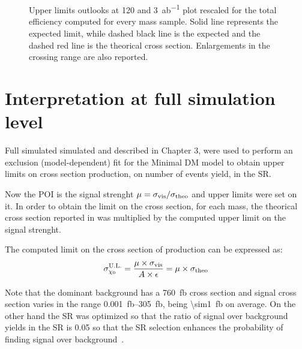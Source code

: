 \begin{figure}[tp]
\centering
{} \quad
{} \\
 \quad
{} \\
\caption{Upper limits outlooks at \SI{120}{\ifb} and \SI{3}{ab^{-1}} plot rescaled for the total efficiency computed for every mass sample. Solid line represents the expected limit, while dashed black line is the expected and the dashed red line is the theorical cross section. Enlargements in the crossing range are also reported.}
\label{fig:outlookmi}
\end{figure}


\section{Interpretation at full simulation level}
\label{sec:full}
Full simulated simulated and described in Chapter 3, were used to perform an exclusion (model-dependent) fit for the Minimal DM model to obtain upper limits on \chizero cross section production, on number of events yield, in the SR.

Now the POI is the signal strenght $\mu=\sigma_\textup{{vis}}/\sigma_{\textup{theo}}$ and upper limits were set on it. In order to obtain the limit on the cross section, for each mass, the theorical cross section reported in \Tab{\ref{tab:eff}} was multiplied by the computed upper limit on the signal strenght. 

The computed limit on the cross section of \chizero production can be expressed as:
\begin{equation}
	\sigma_{\chi_0}^\textup{U.L.}=\frac{\mu\times\sigma_\textup{vis}}{A\times\epsilon}=\mu\times\sigma_\textup{theo}
\end{equation}

Note that the dominant background \znng has a \SI{760}{fb} cross section and signal cross section varies in the range \SIrange{0.001}{305}{fb}, being \SI{\sim1}{fb} on average. On the other hand the SR was optimized so that the ratio of signal over background yields in the SR is \num{0.05} so that the SR selection enhances the probability of finding signal over background~\cite{mgiulia}.

